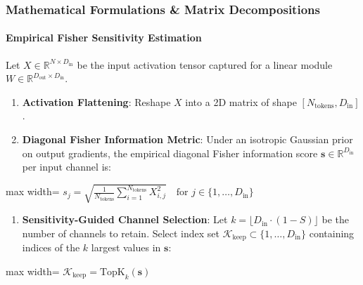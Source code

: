 \subsubsection*{Mathematical Formulations \& Matrix Decompositions}

\paragraph{Empirical Fisher Sensitivity Estimation}

Let $X \in \mathbb{R}^{N \times D_{\text{in}}}$ be the input activation tensor captured for a linear module $W \in \mathbb{R}^{D_{\text{out}} \times D_{\text{in}}}$.

\begin{enumerate}
\item \textbf{Activation Flattening}:
Reshape $X$ into a 2D matrix of shape $[N_{\text{tokens}}, D_{\text{in}}]$.

\item \textbf{Diagonal Fisher Information Metric}:
Under an isotropic Gaussian prior on output gradients, the empirical diagonal Fisher information score $\mathbf{s} \in \mathbb{R}^{D_{\text{in}}}$ per input channel is:
\end{enumerate}
\begin{center}
\begin{adjustbox}{max width=\columnwidth}
$\displaystyle
s_j = \sqrt{ \frac{1}{N_{\text{tokens}}} \sum_{i=1}^{N_{\text{tokens}}} X_{i, j}^2 } \quad \text{for } j \in \{1, \dots, D_{\text{in}}\}
$
\end{adjustbox}
\end{center}

\begin{enumerate}
\item \textbf{Sensitivity-Guided Channel Selection}:
Let $k = \lfloor D_{\text{in}} \cdot (1 - S) \rfloor$ be the number of channels to retain. Select index set $\mathcal{K}_{\text{keep}} \subset \{1, \dots, D_{\text{in}}\}$ containing indices of the $k$ largest values in $\mathbf{s}$:
\end{enumerate}
\begin{center}
\begin{adjustbox}{max width=\columnwidth}
$\displaystyle
\mathcal{K}_{\text{keep}} = \text{TopK}_k(\mathbf{s})
$
\end{adjustbox}
\end{center}

